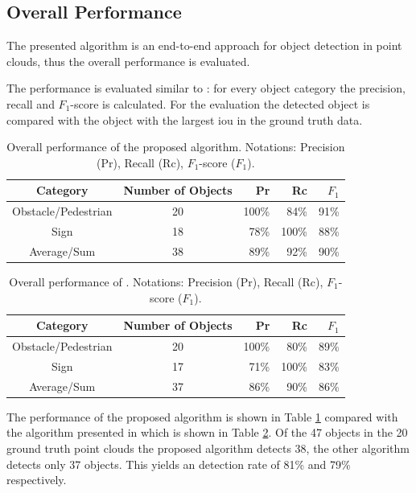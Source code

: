 \subsection{Overall Performance}
The presented algorithm is an end-to-end approach for object detection in point clouds, thus the overall performance is evaluated.

The performance is evaluated similar to \cite{AttBen17}: for every object category the precision, recall and $F_1$-score is calculated. For the evaluation the detected object is compared with the object with the largest \ac{iou} in the ground truth data.

\begin{table}[h!]
    \centering
    \begin{tabular}{c|c|rrr}
        \toprule
        Category & Number of Objects & Pr & Rc & $F_1$\\
        \midrule
        Obstacle/Pedestrian & 20 & 100\% & 84\% & 91\% \\
        Sign & 18 & 78\% & 100\% & 88\% \\
        \midrule
        Average/Sum & 38 & 89\% & 92\% & 90\% \\
        \bottomrule
    \end{tabular}
    \caption{Overall performance of the proposed algorithm. Notations: Precision (Pr), Recall (Rc), $F_1$-score ($F_1$).}
    \label{tab:eval:overallProposed}
\end{table}

\begin{table}[h!]
    \centering
    \begin{tabular}{c|c|rrr}
        \toprule
        Category & Number of Objects & Pr & Rc & $F_1$\\
        \midrule
        Obstacle/Pedestrian & 20 & 100\% & 80\% & 89\% \\
        Sign & 17 & 71\% & 100\% & 83\% \\
        \midrule
        Average/Sum & 37 & 86\% & 90\% & 86\% \\
        \bottomrule
    \end{tabular}
    \caption{Overall performance of \cite{AttBen17}. Notations: Precision (Pr), Recall (Rc), $F_1$-score ($F_1$).}
    \label{tab:eval:overallBnb}
\end{table}

The performance of the proposed algorithm is shown in Table \ref{tab:eval:overallProposed} compared with the algorithm presented in \cite{AttBen17} which is shown in Table \ref{tab:eval:overallBnb}. 
Of the 47 objects in the 20 ground truth point clouds the proposed algorithm detects 38, the other algorithm detects only 37 objects. This yields an detection rate of 81\% and 79\% respectively.

